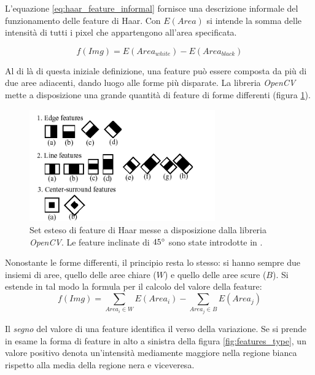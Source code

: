         L'equazione \ref{eq:haar_feature_informal} fornisce una descrizione informale del funzionamento delle feature di Haar. Con $E(Area)$ si intende la somma delle intensità di tutti i pixel che appartengono all'area specificata.

        \begin{equation}
            \label{eq:haar_feature_informal}
            f(Img) = E(Area_{white}) - E(Area_{black})
        \end{equation}

        Al di là di questa iniziale definizione, una feature può essere composta da più di due aree adiacenti, dando luogo alle forme più disparate.
        La libreria \emph{OpenCV} mette a disposizione una grande quantità di feature di forme differenti (figura \ref{fig:opencv_haar_features}).

        \begin{figure}
            \centering
            \includegraphics[width=8cm]{img/open_cv_haar_features.png}
            \caption{Set esteso di feature di Haar messe a disposizione dalla libreria \emph{OpenCV}. 
            Le feature inclinate di $45 \degree$ sono state introdotte in \cite{Lienhart02}.}
            \label{fig:opencv_haar_features}
        \end{figure}

        Nonostante le forme differenti, il principio resta lo stesso: si hanno sempre due insiemi di aree, quello delle aree chiare ($W$) e quello delle aree scure ($B$).
        Si estende in tal modo la formula per il calcolo del valore della feature:
        \begin{equation}
            \label{eq;haar_feature_general}
            f(Img) = \sum_{Area_i \in W}E(Area_i) - \sum_{Area_j \in B}E(Area_j) 
        \end{equation}

        Il \emph{segno} del valore di una feature identifica il verso della variazione. Se si prende in esame la forma di feature in alto a sinistra della figura \ref{fig:features_type}, un valore positivo denota un'intensità mediamente maggiore nella regione bianca rispetto alla media della regione nera e viceveresa.

